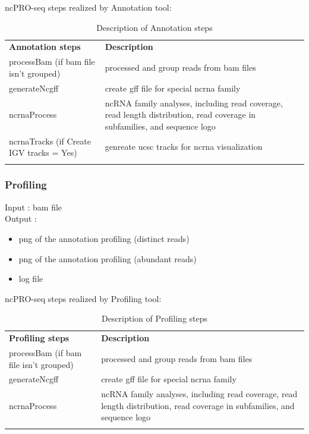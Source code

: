 \documentclass[12pt]{article}
\begin{document}
ncPRO-seq steps realized by Annotation tool:
\begin{center}
\begin{longtable}{|p{8cm}|p{8cm}|}
\hline \rowcolor{gray} 
\textbf{Annotation steps} &	\textbf{Description}\tabularnewline 
processBam (if bam file isn't grouped) &	processed and group reads from bam files\\
generateNcgff &	create gff file for special ncrna family\\
ncrnaProcess&	ncRNA family analyses, including read coverage, read length distribution, read coverage in subfamilies, and sequence logo\\
ncrnaTracks (if Create IGV tracks = Yes) & genreate ucsc tracks for ncrna visualization\\
\hline
\caption{Description of Annotation steps}
\label{tab:configureoptions}
\end{longtable}
\end{center}

\subsubsection{Profiling}

Input : bam file\\
Output : 
\begin{itemize}
 \item png of the annotation profiling (distinct reads)
 \item png of the annotation profiling (abundant reads)
 \item log file
\end{itemize}

ncPRO-seq steps realized by Profiling tool:
\begin{center}
\begin{longtable}{|p{8cm}|p{8cm}|}
\hline \rowcolor{gray} 
\textbf{Profiling steps} &	\textbf{Description}\tabularnewline 
processBam (if bam file isn't grouped) &	processed and group reads from bam files\\
generateNcgff &	create gff file for special ncrna family\\
ncrnaProcess&	ncRNA family analyses, including read coverage, read length distribution, read coverage in subfamilies, and sequence logo\\
\hline
\caption{Description of Profiling steps}
\label{tab:configureoptions}
\end{longtable}
\end{center}
\end{document}
